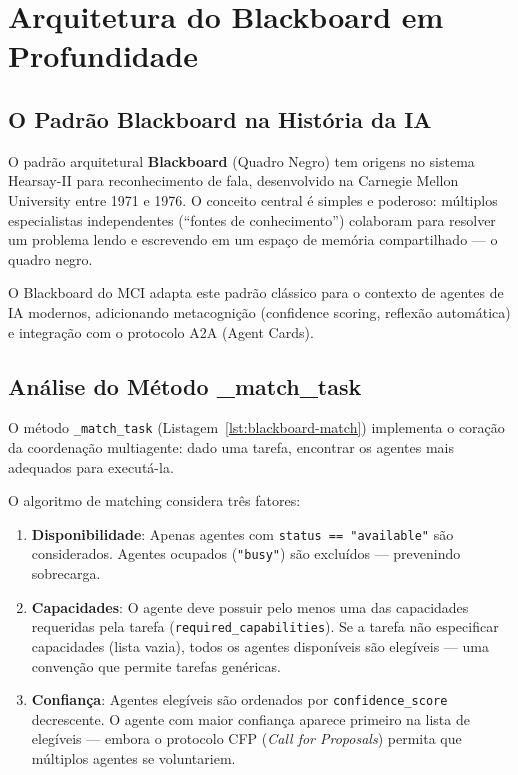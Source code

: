 

\section{Arquitetura do Blackboard em Profundidade}
\label{sec:blackboard-deep}

\subsection{O Padrão Blackboard na História da IA}

O padrão arquitetural \textbf{Blackboard} (Quadro Negro) tem origens no sistema Hearsay-II para reconhecimento de fala, desenvolvido na Carnegie Mellon University entre 1971 e 1976. O conceito central é simples e poderoso: múltiplos especialistas independentes (``fontes de conhecimento'') colaboram para resolver um problema lendo e escrevendo em um espaço de memória compartilhado — o quadro negro.

O Blackboard do MCI adapta este padrão clássico para o contexto de agentes de IA modernos, adicionando metacognição (confidence scoring, reflexão automática) e integração com o protocolo A2A (Agent Cards).

\subsection{Análise do Método \_match\_task}

O método \texttt{\_match\_task} (Listagem~\ref{lst:blackboard-match}) implementa o coração da coordenação multiagente: dado uma tarefa, encontrar os agentes mais adequados para executá-la.

O algoritmo de matching considera três fatores:

\begin{enumerate}
    \item \textbf{Disponibilidade}: Apenas agentes com \texttt{status == "available"} são considerados. Agentes ocupados (\texttt{"busy"}) são excluídos — prevenindo sobrecarga.
    
    \item \textbf{Capacidades}: O agente deve possuir pelo menos uma das capacidades requeridas pela tarefa (\texttt{required\_capabilities}). Se a tarefa não especificar capacidades (lista vazia), todos os agentes disponíveis são elegíveis — uma convenção que permite tarefas genéricas.
    
    \item \textbf{Confiança}: Agentes elegíveis são ordenados por \texttt{confidence\_score} decrescente. O agente com maior confiança aparece primeiro na lista de elegíveis — embora o protocolo CFP (\textit{Call for Proposals}) permita que múltiplos agentes se voluntariem.
\end{enumerate}

